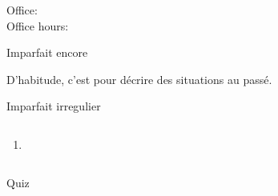 \documentclass{beamer}
\subtitle[Habitudes et imparfait]{Les habitudes et l'imparfait}
\begin{document}
  \begin{frame}
    \titlepage
    \tiny{Office: \\
          Office hours: }
  \end{frame}

  \begin{frame}{Imparfait encore}
    \begin{center}
      
    \end{center}
    D'habitude, c'est pour décrire des situations au passé.
  \end{frame}

  \begin{frame}{Imparfait irregulier}
    \begin{center}
      
    \end{center}
  \end{frame}

  \begin{frame}{}
    \begin{columns}
        
        \begin{enumerate}
          \item 
        \end{enumerate}
        \begin{minipage}[t][0.6\textheight]{\linewidth}
          \begin{center}
          \end{center}
        \end{minipage}
    \end{columns}
  \end{frame}

  \begin{frame}{}
    \begin{center}
      \Large Quiz
    \end{center}
  \end{frame}
\end{document}
